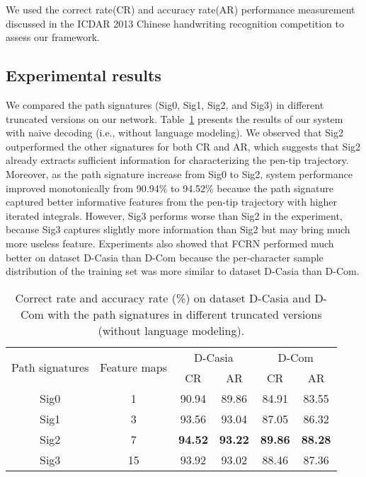 \documentclass[10pt,conference,a4paper]{IEEEtran}
\begin{document}
We used the correct rate(CR) and accuracy rate(AR) performance measurement discussed in the ICDAR 2013 Chinese handwriting recognition competition\cite{liuicdar} to assess our framework.






\subsection{Experimental results}
We compared the path signatures (Sig0, Sig1, Sig2, and Sig3) in different truncated versions on our network.
Table~\ref{TableSigResult} presents the results of our system with naive decoding (i.e., without language modeling).
We observed that Sig2 outperformed the other signatures for both CR and AR, which suggests that Sig2 already extracts sufficient information for characterizing the pen-tip trajectory.
Moreover, as the path signature increase from Sig0 to Sig2, system performance improved monotonically from 90.94\% to 94.52\% because the path signature captured better informative features from the pen-tip trajectory with higher iterated integrals.
However, Sig3 performs worse than Sig2 in the experiment, because Sig3 captures slightly more information than Sig2 but may bring much more useless feature.
Experiments also showed that FCRN performed much better on dataset D-Casia than D-Com because the per-character sample distribution of the training set was more similar to dataset D-Casia than D-Com.

\begin{table}[t]
\caption{Correct rate and accuracy rate (\%) on dataset D-Casia and D-Com with the path signatures in different truncated versions (without language modeling).}
\label{TableSigResult}
\centering
\begin{tabular}{c|c|cc|cc}
\hline
\multirow{2}{*}{Path signatures}&\multirow{2}{*}{Feature maps}&\multicolumn{2}{c|}{D-Casia}&\multicolumn{2}{c}{D-Com}\\
\cline{3-6}
&&CR&AR&CR&AR\\
\hline
Sig0&1& 90.94& 89.86&84.91&83.55\\
Sig1&3& 93.56&93.04 &87.05&86.32\\
Sig2&7& \textbf{94.52}&\textbf{93.22} &\textbf{89.86} &\textbf{88.28}\\
Sig3&15& 93.92&93.02 &88.46&87.36\\
\hline
\end{tabular}
\end{table}
\end{document}
